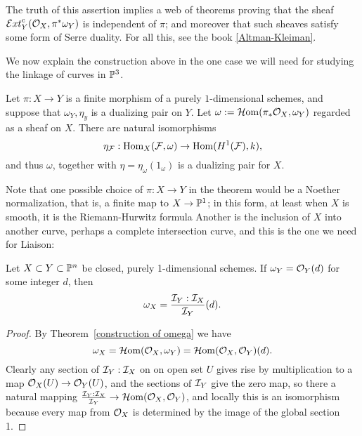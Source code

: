 The truth of this assertion implies a web of theorems proving that the sheaf 
$\sExt_{Y}^{c}(\cO_{X}, \pi^{*}\omega_{Y})$ is independent of $\pi$; and moreover that such sheaves satisfy some form of Serre duality. For all this, see the book
\ref{Altman-Kleiman}.

We now explain the construction above in the one case we will need for studying the linkage of curves in $\PP^{3}$.


\begin{theorem}\label{construction of omega}
Let $\pi: X \to Y$ is a finite morphism of a purely $1$-dimensional schemes, and suppose that
$\omega_{Y}, \eta_{y}$ is a dualizing pair on $Y$. 
Let $\omega := \sHom(\pi_{*}\cO_{X}, \omega_{Y})$ regarded as a sheaf on $X$. There are
natural isomorphisms 
$$
\eta_{\sF}: \Hom_{X}(\sF, \omega) \to \Hom(H^{1}(\sF), k),
$$
and thus $\omega$, together with $\eta = \eta_{\omega}(1_{\omega})$ is a dualizing pair for $X$.
\end{theorem}

Note that one possible choice of $\pi: X\to Y$ in the theorem would be a Noether normalization, that is, a finite map to $X \to \PP^{1}$; in this form, at least when $X$ is smooth, it is the Riemann-Hurwitz formula  Another is the inclusion of $X$ into another curve, perhaps a complete intersection curve, and this is the one we need for Liaison:

\begin{corollary}\label{dualizing formula}
 Let $X\subset Y\subset \PP^{n}$ be closed, purely 1-dimensional schemes. If  $\omega_{Y} = \sO_{Y}(d)$ for some integer $d$, then 
 $$
 \omega_{X} = \frac{\sI_{Y}:\sI_{X}}{\sI_{Y}}(d).
 $$
\end{corollary}

\begin{proof}
By Theorem~\ref{construction of omega} we have 
$$
\omega_{X} = \sHom(\sO_{X}, \omega_{Y}) = \sHom(\sO_{X}, \sO_{Y})(d).
$$
Clearly any  section of $\sI_{Y}:\sI_{X}$ on on open set $U$ gives rise by multiplication to a
map   
$\sO_{X}(U) \to \sO_{Y}(U)$, and the sections of  $\sI_{Y}$ give the zero map,
so there a natural mapping $\frac{\sI_{Y}:\sI_{X}}{\sI_{Y}} \to \sHom(\sO_{X}, \sO_{Y})$,
and locally this is an isomorphism because every map from $\sO_{X}$ is determined by the image of the global section 1.
\end{proof}


